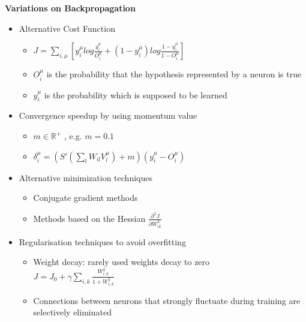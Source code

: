 \documentclass[main]{subfiles}
\begin{document}
\textbf{Variations on Backpropagation}
\begin{itemize}
\item Alternative Cost Function \begin{itemize}[label={$\circ$}]
\item $J=\sum_{i,\mu}[y^{\mu}_ilog\frac{y_i^{\mu}}{O_i^{\mu}}+(1-y_i^{\mu})log\frac{1-y_i^{\mu}}{1-O_i^{\mu}}]$
\item $O_i^{\mu}$ is the probability that the hypothesis represented by a neuron is true
\item $y_i^{\mu}$ is the probability which is supposed to be learned
\end{itemize}
\item Convergence speedup by using momentum value \begin{itemize}[label={$\circ$}]\item $m \in \mathbb{R}^+$ , e.g. $m = 0.1$ \item
$\delta_i^{\mu}=(S'(\sum_lW_{il}V_l^{\mu})+m)(y_i^{\mu}-O_i^{\mu})$\end{itemize}
\item Alternative minimization techniques \begin{itemize}[label={$\circ$}]
\item Conjugate gradient methods
\item Methods based on the Hessian $\frac{\partial^2J}{\partial W^2_{ik}}$
\end{itemize}
\item Regularisation techniques to avoid overfitting
\begin{itemize}[label={$\circ$}]
\item Weight decay: rarely used weights decay to zero \\$J=J_0+\gamma\sum_{i,k}\frac{W_{i,k}^2}{1+W_{i,k}^2}$
\item Connections between neurons that strongly fluctuate during training are selectively eliminated
\end{itemize}

\end{itemize}
\end{document}
